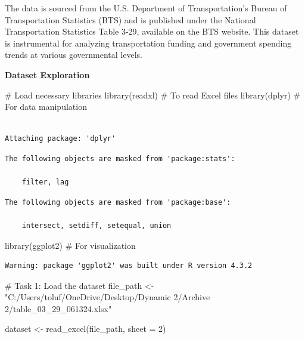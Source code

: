 \documentclass[
  letterpaper,
  DIV=11,
  numbers=noendperiod]{scrreprt}
\newenvironment{Shaded}{\begin{snugshade}}{\end{snugshade}}
\newcommand{\AttributeTok}[1]{\textcolor[rgb]{0.40,0.45,0.13}{#1}}
\newcommand{\CommentTok}[1]{\textcolor[rgb]{0.37,0.37,0.37}{#1}}
\newcommand{\DecValTok}[1]{\textcolor[rgb]{0.68,0.00,0.00}{#1}}
\newcommand{\FunctionTok}[1]{\textcolor[rgb]{0.28,0.35,0.67}{#1}}
\newcommand{\NormalTok}[1]{\textcolor[rgb]{0.00,0.23,0.31}{#1}}
\newcommand{\OtherTok}[1]{\textcolor[rgb]{0.00,0.23,0.31}{#1}}
\newcommand{\StringTok}[1]{\textcolor[rgb]{0.13,0.47,0.30}{#1}}
\begin{document}
The data is sourced from the U.S. Department of Transportation's Bureau
of Transportation Statistics (BTS) and is published under the National
Transportation Statistics Table 3-29, available on the BTS website. This
dataset is instrumental for analyzing transportation funding and
government spending trends at various governmental levels.

\textbf{Dataset Exploration}

\begin{Shaded}
\begin{Highlighting}[]
\CommentTok{\# Load necessary libraries}
\FunctionTok{library}\NormalTok{(readxl)  }\CommentTok{\# To read Excel files}
\FunctionTok{library}\NormalTok{(dplyr)   }\CommentTok{\# For data manipulation}
\end{Highlighting}
\end{Shaded}

\begin{verbatim}

Attaching package: 'dplyr'
\end{verbatim}

\begin{verbatim}
The following objects are masked from 'package:stats':

    filter, lag
\end{verbatim}

\begin{verbatim}
The following objects are masked from 'package:base':

    intersect, setdiff, setequal, union
\end{verbatim}

\begin{Shaded}
\begin{Highlighting}[]
\FunctionTok{library}\NormalTok{(ggplot2) }\CommentTok{\# For visualization}
\end{Highlighting}
\end{Shaded}

\begin{verbatim}
Warning: package 'ggplot2' was built under R version 4.3.2
\end{verbatim}

\begin{Shaded}
\begin{Highlighting}[]
\CommentTok{\# Task 1: Load the dataset}
\NormalTok{file\_path }\OtherTok{\textless{}{-}}  \StringTok{"C:/Users/toluf/OneDrive/Desktop/Dynamic 2/Archive 2/table\_03\_29\_061324.xlsx"} 


\NormalTok{dataset }\OtherTok{\textless{}{-}} \FunctionTok{read\_excel}\NormalTok{(file\_path, }\AttributeTok{sheet =} \DecValTok{2}\NormalTok{)}
\end{Highlighting}
\end{Shaded}
\end{document}

